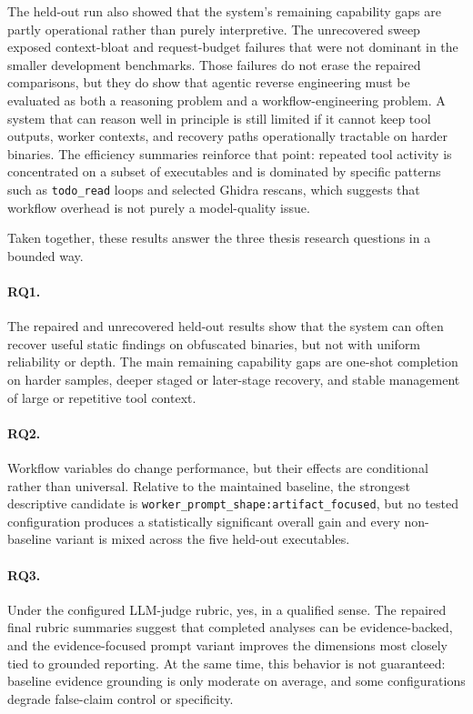 The held-out run also showed that the system's remaining capability gaps are partly operational rather than purely interpretive. The unrecovered sweep exposed context-bloat and request-budget failures that were not dominant in the smaller development benchmarks. Those failures do not erase the repaired comparisons, but they do show that agentic reverse engineering must be evaluated as both a reasoning problem and a workflow-engineering problem. A system that can reason well in principle is still limited if it cannot keep tool outputs, worker contexts, and recovery paths operationally tractable on harder binaries. The efficiency summaries reinforce that point: repeated tool activity is concentrated on a subset of executables and is dominated by specific patterns such as \texttt{todo\_read} loops and selected Ghidra rescans, which suggests that workflow overhead is not purely a model-quality issue.

Taken together, these results answer the three thesis research questions in a bounded way.

\paragraph{RQ1.} The repaired and unrecovered held-out results show that the system can often recover useful static findings on obfuscated binaries, but not with uniform reliability or depth. The main remaining capability gaps are one-shot completion on harder samples, deeper staged or later-stage recovery, and stable management of large or repetitive tool context.

\paragraph{RQ2.} Workflow variables do change performance, but their effects are conditional rather than universal. Relative to the maintained baseline, the strongest descriptive candidate is \texttt{worker\_prompt\_shape:artifact\_focused}, but no tested configuration produces a statistically significant overall gain and every non-baseline variant is mixed across the five held-out executables.

\paragraph{RQ3.} Under the configured LLM-judge rubric, yes, in a qualified sense. The repaired final rubric summaries suggest that completed analyses can be evidence-backed, and the evidence-focused prompt variant improves the dimensions most closely tied to grounded reporting. At the same time, this behavior is not guaranteed: baseline evidence grounding is only moderate on average, and some configurations degrade false-claim control or specificity.

